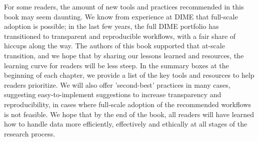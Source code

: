 For some readers, the amount of new tools and practices recommended in this book may seem daunting.
We know from experience at DIME that full-scale adoption is possible;
in the last few years, the full DIME portfolio has transitioned to 
transparent and reproducible workflows, with a fair share of hiccups along the way.
The authors of this book supported that at-scale transition,
and we hope that by sharing our lessons learned and resources, 
the learning curve for readers will be less steep. 
In the summary boxes at the beginning of each chapter, 
we provide a list of the key tools and resources to help readers prioritize.
We will also offer 'second-best' practices in many cases, 
suggesting easy-to-implement suggestions to increase transparency and reproducibility,
in cases where full-scale adoption of the recommended workflows is not feasible.   
We hope that by the end of the book,
all readers will have learned how to handle data more efficiently, effectively and ethically
at all stages of the research process.

\mainmatter

